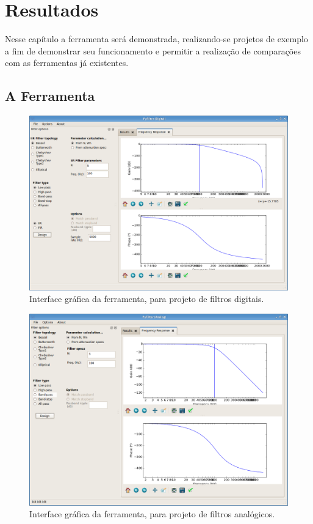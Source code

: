 \chapter{Resultados}

Nesse capítulo a ferramenta será demonstrada, realizando-se projetos de exemplo a fim de demonstrar seu funcionamento e permitir a realização de comparações com as ferramentas já existentes.

\section{A Ferramenta}

\begin{figure}[H]
  \centering
  \includegraphics[scale=0.4]{images/screens/pyfilter_digital_gui}
  \caption{Interface gráfica da ferramenta, para projeto de filtros digitais. }
  \label{fig:pyfilter_gui}
\end{figure}

\begin{figure}[H]
  \centering
  \includegraphics[scale=0.4]{images/screens/pyfilter_analog_gui}
  \caption{Interface gráfica da ferramenta, para projeto de filtros analógicos.}
  \label{fig:pyfilter_analog_gui}
\end{figure}


